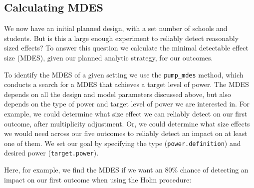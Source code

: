 \documentclass{article}
\begin{document}
\subsection{Calculating MDES}

We now have an initial planned design, with a set number of schools and
students. But is this a large enough experiment to reliably detect
reasonably sized effects? To answer this question we calculate the
minimal detectable effect size (MDES), given our planned analytic
strategy, for our outcomes.

To identify the MDES of a given setting we use the \texttt{pump\_mdes}
method, which conducts a search for a MDES that achieves a target level
of power. The MDES depends on all the design and model parameters
discussed above, but also depends on the type of power and target level
of power we are interested in. For example, we could determine what size
effect we can reliably detect on our first outcome, after multiplicity
adjustment. Or, we could determine what size effects we would need
across our five outcomes to reliably detect an impact on at least one of
them. We set our goal by specifying the type (\texttt{power.definition})
and desired power (\texttt{target.power}).

Here, for example, we find the MDES if we want an 80\% chance of
detecting an impact on our first outcome when using the Holm procedure:
\end{document}
